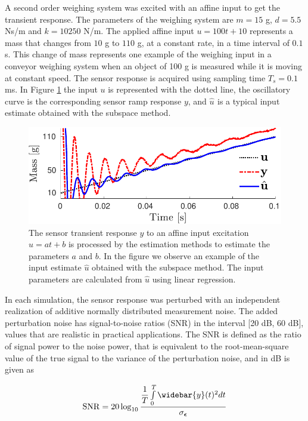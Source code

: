 A second order weighing system was excited with an affine input to get the transient response.
The parameters of the weighing system are $m = 15$ g, $d = 5.5$ Ns/m and $k = 10250$ N/m.
The applied affine input $u = 100 t + 10$ represents a mass that changes from $10$ g to $110$ g, at a constant rate, in a time interval of $0.1$ s.
This change of mass represents one example of the weighing input in a conveyor weighing system when an object of 100 g is measured while it is moving at constant speed.
The sensor response is acquired using sampling time $T_s = 0.1$ ms.
In Figure \ref{fig:sensor_weight} the input $u$ is represented with the dotted line, the oscillatory curve is the corresponding sensor ramp response $y$, and $\widehat{u}_{\mathrm{}}$ is a typical input estimate obtained with the subspace method.


\begin{figure}[!htbp]
\centering
\includegraphics[width=1\columnwidth]{./ChapterRampInput/fig/Fig_2.pdf} 
\caption{ \label{fig:sensor_weight} The sensor transient response $y$ to an affine input excitation $u = at+b$ is processed by the estimation methods to estimate the parameters $a$ and $b$. In the figure we observe an example of the input estimate $\widehat{u}$ obtained with the subspace method. The input parameters are calculated from $\widehat{u}$ using linear regression.}
\end{figure}

In each simulation, the sensor response was perturbed with an independent realization of additive normally distributed measurement noise.
The added perturbation noise has signal-to-noise ratios (SNR) in the interval [20 dB, 60 dB], values that are realistic in practical applications.
The SNR is defined as the ratio of signal power to the noise power, that is equivalent to the root-mean-square value of the true signal to the variance of the perturbation noise, and in dB is given as

\begin{equation} \mathrm{SNR} = 20 \log_{10}{\dfrac{\dfrac{1}{T}\int\limits_0^T{\widebar{y}(t)^2 d t}}{\sigma_{\bm{\epsilon}}}} \end{equation}  


